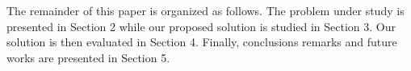 


The remainder of this paper is organized as follows. The problem under study is presented in Section 2 while our proposed solution is studied in Section 3. Our solution is then evaluated in Section 4. Finally, conclusions remarks and future works are presented in Section 5.






